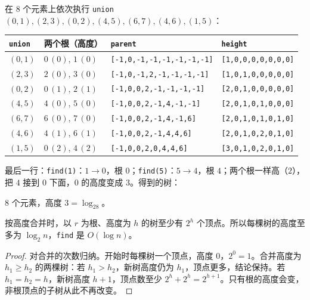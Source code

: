 \begin{example}\label{ex:mst-kruskal:height}
在 $8$ 个元素上依次执行 \texttt{union} $(0,1),(2,3),(0,2),(4,5),(6,7),(4,6),(1,5)$：
\begin{center}
\small
\begin{tabular}{llll}
\toprule
\texttt{union} & 两个根（高度） & \texttt{parent} & \texttt{height} \\
\midrule
$(0,1)$ & $0\,(0)$, $1\,(0)$ & \texttt{[-1,0,-1,-1,-1,-1,-1,-1]} & \texttt{[1,0,0,0,0,0,0,0]} \\
$(2,3)$ & $2\,(0)$, $3\,(0)$ & \texttt{[-1,0,-1,2,-1,-1,-1,-1]} & \texttt{[1,0,1,0,0,0,0,0]} \\
$(0,2)$ & $0\,(1)$, $2\,(1)$ & \texttt{[-1,0,0,2,-1,-1,-1,-1]} & \texttt{[2,0,1,0,0,0,0,0]} \\
$(4,5)$ & $4\,(0)$, $5\,(0)$ & \texttt{[-1,0,0,2,-1,4,-1,-1]} & \texttt{[2,0,1,0,1,0,0,0]} \\
$(6,7)$ & $6\,(0)$, $7\,(0)$ & \texttt{[-1,0,0,2,-1,4,-1,6]} & \texttt{[2,0,1,0,1,0,1,0]} \\
$(4,6)$ & $4\,(1)$, $6\,(1)$ & \texttt{[-1,0,0,2,-1,4,4,6]} & \texttt{[2,0,1,0,2,0,1,0]} \\
$(1,5)$ & $0\,(2)$, $4\,(2)$ & \texttt{[-1,0,0,2,0,4,4,6]} & \texttt{[3,0,1,0,2,0,1,0]} \\
\bottomrule
\end{tabular}
\end{center}
最后一行：\texttt{find(1)}：$1\to0$，根 $0$；\texttt{find(5)}：$5\to4$，根 $4$；两个根一样高（$2$），把 $4$ 接到 $0$ 下面，$0$ 的高度变成 $3$。得到的树：
\begin{center}
\end{center}
8 个元素，高度 $3=\log_28$。
\end{example}

\begin{lemma}\label{lem:mst-kruskal:height}
按高度合并时，以 $r$ 为根、高度为 $h$ 的树至少有 $2^h$ 个顶点。所以每棵树的高度至多为 $\log_2n$，\texttt{find} 是 $O(\log n)$。
\end{lemma}
\begin{proof}
对合并的次数归纳。开始时每棵树一个顶点，高度 $0$，$2^0=1$。合并高度为 $h_1\geqslant h_2$ 的两棵树：若 $h_1>h_2$，新树高度仍为 $h_1$，顶点更多，结论保持。若 $h_1=h_2=h$，新树高度 $h+1$，顶点数至少 $2^h+2^h=2^{h+1}$。只有根的高度会变，非根顶点的子树从此不再改变。
\end{proof}

